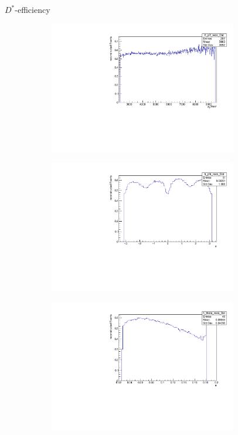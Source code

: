 \documentclass[11pt]{beamer}
\begin{document}
\begin{frame}{$D^*$-efficiency}
\begin{figure}
\begin{subfigure}{0.45\textwidth}
\includegraphics[width=0.9\textwidth]{up_pdf/h_pt_reco_Dst.pdf}
\end{subfigure}
\begin{subfigure}{0.45\textwidth}
\includegraphics[width=0.9\textwidth]{up_pdf/h_phi_reco_Dst.pdf}
\end{subfigure}
\begin{subfigure}{0.45\textwidth}
\includegraphics[width=0.9\textwidth]{up_pdf/h_theta_reco_Dst.pdf}

\end{subfigure}
\end{figure}
\end{frame}
\end{document}
